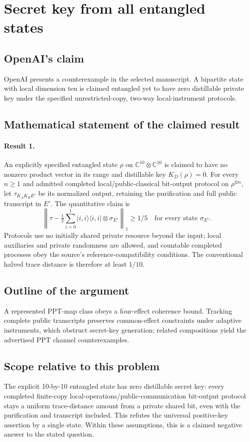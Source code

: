 \documentclass[11pt]{article}
\begin{document}
\section*{Secret key from all entangled states}

\subsection{OpenAI's claim}
OpenAI presents a counterexample in the selected manuscript. A bipartite state with local dimension ten is claimed entangled yet to have zero distillable private key under the specified unrestricted-copy, two-way local-instrument protocols.

\subsection{Mathematical statement of the claimed result}
\paragraph{Result 1.} An explicitly specified entangled state \(\rho\) on \(\mathbb C^{10}\otimes\mathbb C^{10}\) is claimed to have no nonzero product vector in its range and distillable key \(K_D(\rho)=0\). For every \(n\ge1\) and admitted completed local/public-classical bit-output protocol on \(\rho^{\otimes n}\), let \(\tau_{K_AK_BE'}\) be its normalized output, retaining the purification and full public transcript in \(E'\). The quantitative claim is
\[
 \left\|\tau-\tfrac12\sum_{i=0}^1|i,i\rangle\langle i,i|\otimes\sigma_{E'}\right\|_1\ge1/5
 \quad\text{for every state }\sigma_{E'}.
\]
Protocols use no initially shared private resource beyond the input; local auxiliaries and private randomness are allowed, and countable completed processes obey the source's reference-compatibility conditions. The conventional halved trace distance is therefore at least \(1/10\).

\subsection{Outline of the argument}
A represented PPT-map class obeys a four-effect coherence bound. Tracking complete public transcripts preserves common-effect constraints under adaptive instruments, which obstruct secret-key generation; related compositions yield the advertised PPT channel counterexamples.

\subsection{Scope relative to this problem}
The explicit 10-by-10 entangled state has zero distillable secret key: every completed finite-copy local-operations/public-communication bit-output protocol stays a uniform trace-distance amount from a private shared bit, even with the purification and transcript included. This refutes the universal positive-key assertion by a single state. Within these assumptions, this is a claimed negative answer to the stated question.
\end{document}
